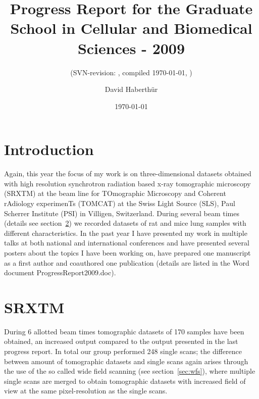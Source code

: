 \documentclass[a4paper,twoside,DIV=calc]{scrartcl}
\title{Progress Report for the Graduate School in Cellular and Biomedical Sciences - 2009}
\subtitle{(SVN-revision: \svnkw{LastChangedRevision}, compiled \today, \thistime)}
\author{David Haberthür}
\date{\today}
\begin{document}
\maketitle

\section{Introduction}
Again, this year the focus of my work is on three-dimensional datasets obtained with high resolution synchrotron radiation based x-ray tomographic microscopy (SRXTM) at the beam line for TOmographic Microscopy and Coherent rAdiology experimenTs (TOMCAT) at the Swiss Light Source (SLS), Paul Scherrer Institute (PSI) in Villigen, Switzerland. During several beam times (details see section~\ref{sec:srxtm}) we recorded datasets of rat and mice lung samples with different characteristics. In the past year I have presented my work in multiple talks at both national and international conferences and have presented several posters about the topics I have been working on, have prepared one manuscript as a first author and coauthored one publication (details are listed in the Word document ProgressReport2009.doc).

\section{SRXTM}\label{sec:srxtm}
During 6 allotted beam times tomographic datasets of 170 samples have been obtained, an increased output compared to the output presented in the last progress report. In total our group performed 248 single scans; the difference between amount of tomographic datasets and single scans again arises through the use of the so called wide field scanning (see section~\ref{sec:wfs}), where multiple single scans are merged to obtain tomographic datasets with increased field of view at the same pixel-resolution as the single scans.
\end{document}
